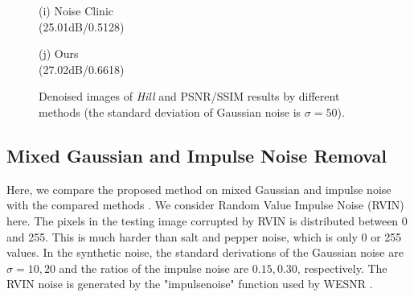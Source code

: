 \documentclass[runningheads]{llncs}
\begin{document}
\begin{figure}
{\begin{minipage}[t]{0.2\textwidth}
{\footnotesize (i) Noise Clinic \\(25.01dB/0.5128)}
\end{minipage}
\begin{minipage}[t]{0.2\textwidth}
\centering
{}
{\footnotesize (j) Ours \\(27.02dB/0.6618)}
\end{minipage}
}
\vspace{-0.1in}
\caption{Denoised images of \textsl{Hill} and PSNR/SSIM results by different methods (the standard deviation of Gaussian noise is $\sigma=50$).}
\label{fig6}
\end{figure}

\subsection{Mixed Gaussian and Impulse Noise Removal}
Here, we compare the proposed method on mixed Gaussian and impulse noise with the compared methods \cite{bpfa,bm3d,pgpd,wnnm,cai2010fast,wesnr,noiseclinic}. We consider Random Value Impulse Noise (RVIN) here. The pixels in the testing image corrupted by RVIN is distributed between 0 and 255. This is much harder than salt and pepper noise, which is only 0 or 255 values. In the synthetic noise, the standard derivations of the Gaussian noise are $\sigma=10, 20$ and the ratios of the impulse noise are $0.15, 0.30$, respectively. The RVIN noise is generated by the "impulsenoise" function used by WESNR \cite{wesnr}. 
\end{document}
